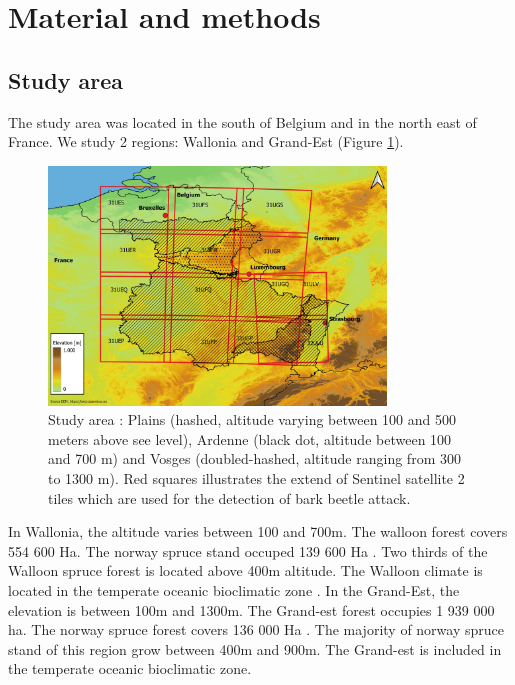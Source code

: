 \documentclass[3p,procedia]{elsarticle}
\begin{document}
\section{Material and methods}
\subsection{Study area}
The study area was located in the south of Belgium and in the north east of France. We study 2 regions: Wallonia and Grand-Est (Figure \ref{fig:situ}).
\begin{figure} [htbp] 
	\centering
	\includegraphics[width=0.8\textwidth]{gde.jpeg}
	\caption{Study area : Plains (hashed, altitude varying between 100 and 500 meters above see level), Ardenne (black dot, altitude between 100 and 700 m) and Vosges (doubled-hashed, altitude ranging from 300 to 1300 m). Red squares illustrates the extend of Sentinel satellite 2 tiles which are used for the detection of bark beetle attack.}
	\label{fig:situ}
\end{figure}
In Wallonia, the altitude varies between 100 and 700m.
The walloon forest covers 554 600 Ha. 
The norway spruce stand occuped 139 600 Ha \citep{Alderweireld_2015}. 
Two thirds of the Walloon spruce forest is located above 400m altitude. 
The Walloon climate is located in the temperate oceanic bioclimatic zone \citep{lindner_climate_2010}. 
In the Grand-Est, the elevation is between 100m and 1300m. 
The Grand-est forest occupies 1 939 000 ha. 
The norway spruce forest covers 136 000 Ha \citep{IGN2022}. 
The majority of norway spruce stand of this region grow between 400m and 900m. 
The Grand-est is included in the temperate oceanic bioclimatic zone\citep{lindner_climate_2010}. 
\end{document}

